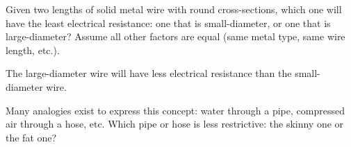 

Given two lengths of solid metal wire with round cross-sections, which one will have the least electrical resistance: one that is small-diameter, or one that is large-diameter?  Assume all other factors are equal (same metal type, same wire length, etc.).







The large-diameter wire will have less electrical resistance than the small-diameter wire.







Many analogies exist to express this concept: water through a pipe, compressed air through a hose, etc.  Which pipe or hose is less restrictive: the skinny one or the fat one?




